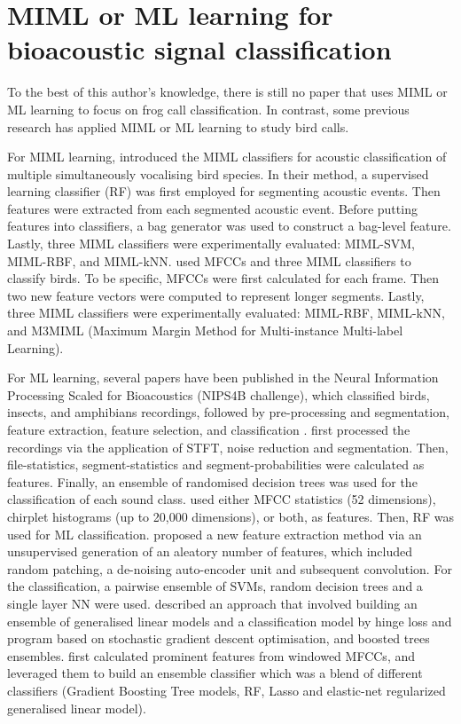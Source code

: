 \section{MIML or ML learning for bioacoustic signal classification}
To the best of this author's knowledge, there is still no paper that uses MIML or ML learning to focus on frog call classification. In contrast, some previous research has applied MIML or ML learning to study bird calls.

For MIML learning, \citet{briggs2012acoustic} introduced the MIML classifiers for acoustic classification of multiple simultaneously vocalising bird species. In their method, a supervised learning classifier (RF) was first employed for segmenting acoustic events. Then features were extracted from each segmented acoustic event. Before putting features into classifiers, a bag generator was used to construct a bag-level feature. Lastly, three MIML classifiers were experimentally evaluated: MIML-SVM, MIML-RBF, and MIML-kNN.
\citet{dufour2013multi} used MFCCs and three MIML classifiers to classify birds. To be specific, MFCCs were first calculated for each frame. Then two new feature vectors were computed to represent longer segments.
Lastly, three MIML classifiers were experimentally evaluated: MIML-RBF, MIML-kNN, and M3MIML (Maximum Margin Method for Multi-instance Multi-label Learning). 

For ML learning, several papers have been published in the Neural Information Processing Scaled for Bioacoustics (NIPS4B challenge), which classified birds, insects, and amphibians recordings, followed by pre-processing and segmentation, feature extraction, feature selection, and classification \citep{lasseck2013bird, stowell2013feature, mencia2013learning, massaronensemble, chen2013novel}. \citet{lasseck2013bird} first processed the recordings via the application of STFT, noise reduction and segmentation. Then, file-statistics, segment-statistics and segment-probabilities were calculated as  features. Finally, an ensemble of randomised decision trees was used for the classification of each sound class. \citet{stowell2013feature} used either MFCC statistics (52 dimensions), chirplet histograms (up to 20,000 dimensions), or both, as  features. Then, RF was used for ML classification. \citep{mencia2013learning} proposed a new feature extraction method via an unsupervised generation of an aleatory number of features, which included random patching, a de-noising auto-encoder unit and subsequent convolution. For the classification, a pairwise ensemble of SVMs, random decision trees and a single layer NN were used. \citet{massaronensemble} described an approach that involved building an ensemble of generalised linear models and a classification model by hinge loss and program based on stochastic gradient descent optimisation, and boosted trees ensembles. 
\citet{chen2013novel} first calculated prominent features from windowed MFCCs, and leveraged them to build an ensemble classifier which was a blend of different classifiers (Gradient Boosting Tree models, RF, Lasso and elastic-net regularized generalised linear model).




